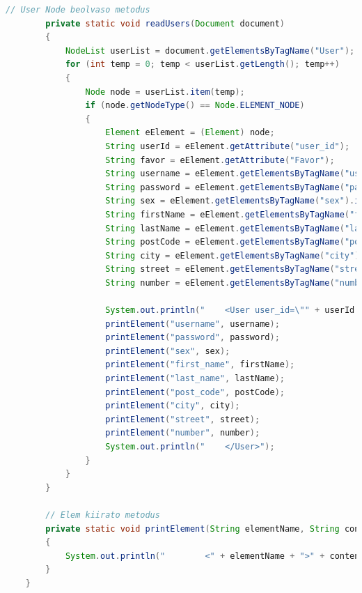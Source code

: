 \documentclass[12pt]{report}
\begin{document}
\begin{lstlisting}[caption={DOMReadKLNSPG.java} adatolvasó program, language=Java]
		// User Node beolvaso metodus
		private static void readUsers(Document document)
		{
			NodeList userList = document.getElementsByTagName("User");
			for (int temp = 0; temp < userList.getLength(); temp++) 
			{
				Node node = userList.item(temp);
				if (node.getNodeType() == Node.ELEMENT_NODE) 
				{
					Element eElement = (Element) node;
					String userId = eElement.getAttribute("user_id");
					String favor = eElement.getAttribute("Favor");
					String username = eElement.getElementsByTagName("username").item(0).getTextContent();
					String password = eElement.getElementsByTagName("password").item(0).getTextContent();
					String sex = eElement.getElementsByTagName("sex").item(0).getTextContent();
					String firstName = eElement.getElementsByTagName("first_name").item(0).getTextContent();
					String lastName = eElement.getElementsByTagName("last_name").item(0).getTextContent();
					String postCode = eElement.getElementsByTagName("post_code").item(0).getTextContent();
					String city = eElement.getElementsByTagName("city").item(0).getTextContent();
					String street = eElement.getElementsByTagName("street").item(0).getTextContent();
					String number = eElement.getElementsByTagName("number").item(0).getTextContent();
					
					System.out.println("    <User user_id=\"" + userId + "\" Favor=\"" + favor + "\">");
					printElement("username", username);
					printElement("password", password);
					printElement("sex", sex);
					printElement("first_name", firstName);
					printElement("last_name", lastName);
					printElement("post_code", postCode);
					printElement("city", city);
					printElement("street", street);
					printElement("number", number);
					System.out.println("    </User>");
				}
			}
		}
		
		// Elem kiirato metodus
		private static void printElement(String elementName, String content)
		{
			System.out.println("        <" + elementName + ">" + content + "</" + elementName + ">");
		}
	}
\end{lstlisting}
\end{document}
